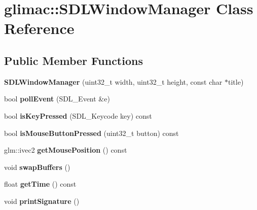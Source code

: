 \hypertarget{classglimac_1_1SDLWindowManager}{}\section{glimac\+:\+:S\+D\+L\+Window\+Manager Class Reference}
\label{classglimac_1_1SDLWindowManager}
\subsection*{Public Member Functions}
\begin{DoxyCompactItemize}
\item 
\mbox{\label{classglimac_1_1SDLWindowManager_aaddb3bc2ec58bc1e818276e81605520f}} 
{\bfseries S\+D\+L\+Window\+Manager} (uint32\+\_\+t width, uint32\+\_\+t height, const char $\ast$title)
\item 
\mbox{\label{classglimac_1_1SDLWindowManager_a4b2fd3e74f00c28d3b03e0cff3bb0131}} 
bool {\bfseries poll\+Event} (S\+D\+L\+\_\+\+Event \&e)
\item 
\mbox{\label{classglimac_1_1SDLWindowManager_aa5941f14a1a2098da1a072b2dac43930}} 
bool {\bfseries is\+Key\+Pressed} (S\+D\+L\+\_\+\+Keycode key) const
\item 
\mbox{\label{classglimac_1_1SDLWindowManager_a3f970279f069c97d64845687f1af5743}} 
bool {\bfseries is\+Mouse\+Button\+Pressed} (uint32\+\_\+t button) const
\item 
\mbox{\label{classglimac_1_1SDLWindowManager_aac32964a8c7e0e0e790b8fab29ac2831}} 
glm\+::ivec2 {\bfseries get\+Mouse\+Position} () const
\item 
\mbox{\label{classglimac_1_1SDLWindowManager_aee6b4f60e5b418a99d35360aea48bd41}} 
void {\bfseries swap\+Buffers} ()
\item 
\mbox{\label{classglimac_1_1SDLWindowManager_ae79e8321234999083adda1287cf825fe}} 
float {\bfseries get\+Time} () const
\item 
\mbox{\label{classglimac_1_1SDLWindowManager_ae4ddac1da16f866bbd2bd685556afe8e}} 
void {\bfseries print\+Signature} ()
\end{DoxyCompactItemize}
